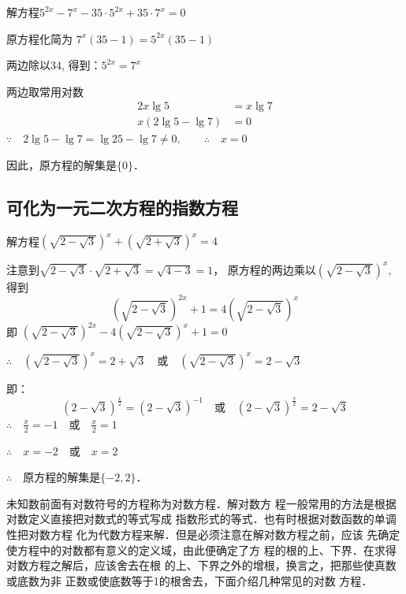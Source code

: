 \begin{example}
  解方程$5^{2x}-7^x-35\cdot 5^{2x}+35\cdot 7^x=0$
\end{example}

\begin{solution}
    原方程化简为
  $7^x (35-1)=5^{2x}(35-1)$

  两边除以34, 得到：$5^{2x}=7^x$

  两边取常用对数
  \[\begin{split}
    2x\lg5&=x\lg7\\
  x(2\lg5-\lg7)&=0
  \end{split} \]
$\because\quad   2\lg5-\lg7=\lg25-\lg7\ne 0,\qquad \therefore\quad x=0$

  因此，原方程的解集是$\{0\}$．
\end{solution}

\subsection{可化为一元二次方程的指数方程}

\begin{example}
    解方程$\left(\sqrt{2-\sqrt{3}}\right)^x+\left(\sqrt{2+\sqrt{3}}\right)^x=4$
\end{example}

\begin{solution}
    注意到$\sqrt{2-\sqrt{3}}\cdot \sqrt{2+\sqrt{3}}=\sqrt{4-3}=1$，
原方程的两边乘以$\left(\sqrt{2-\sqrt{3}}\right)^x$, 得到
\[\left(\sqrt{2-\sqrt{3}}\right)^{2x}+1=4\left(\sqrt{2-\sqrt{3}}\right)^x\]
即
$\left(\sqrt{2-\sqrt{3}}\right)^{2x}-4\left(\sqrt{2-\sqrt{3}}\right)^x+1=0$

$\therefore\quad \left(\sqrt{2-\sqrt{3}}\right)^x=2+\sqrt{3}\quad \text{或}\quad \left(\sqrt{2-\sqrt{3}}\right)^x=2-\sqrt{3}$

即：
\[\left({2-\sqrt{3}}\right)^{\tfrac{x}{2}}=\left({2-\sqrt{3}}\right)^{-1}\quad \text{或}\quad \left({2-\sqrt{3}}\right)^{\tfrac{x}{2}}=2-\sqrt{3}\]
$\therefore\quad \frac{x}{2}=-1\quad \text{或}\quad \frac{x}{2}=1$

$\therefore\quad x=-2\quad \text{或}\quad x=2$

$\therefore\quad $原方程的解集是$\{-2,2\}$．
\end{solution}

未知数前面有对数符号的方程称为对数方程．解对数方
程一般常用的方法是根据对数定义直接把对数式的等式写成
指数形式的等式．也有时根据对数函数的单调性把对数方程
化为代数方程来解．但是必须注意在解对数方程之前，应该
先确定使方程中的对数都有意义的定义域，由此便确定了方
程的根的上、下界．在求得对数方程之解后，应该舍去在根
的上、下界之外的增根，换言之，把那些使真数或底数为非
正数或使底数等于1的根舍去，下面介绍几种常见的对数
方程．

